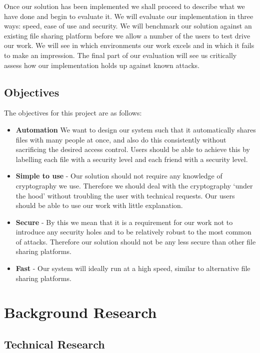 \documentclass[12pt, titlepage]{article}
\begin{document}
\newline \indent Once our solution has been implemented we shall proceed to describe what we have done and begin to evaluate it. We will evaluate our implementation in three ways: speed, ease of use and security. We will benchmark our solution against an existing file sharing platform before we allow a number of the users to test drive our work. We will see in which environments our work excels and in which it fails to make an impression. The final part of our evaluation will see us critically assess how our implementation holds up against known attacks.

\subsection{Objectives}
The objectives for this project are as follows:
\begin{itemize}
	\item \textbf{Automation} We want to design our system such that it automatically shares files with many people at once, and also do this consistently without sacrificing the desired access control. Users should be able to achieve this by labelling each file with a security level and each friend with a security level.
	\item \textbf{Simple to use} - Our solution should not require any knowledge of cryptography we use. Therefore we should deal with the cryptography `under the hood' without troubling the user with technical requests. Our users should be able to use our work with little explanation.
	\item \textbf{Secure} - By this we mean that it is a requirement for our work not to introduce any security holes and to be relatively robust to the most common of attacks. Therefore our solution should not be any less secure than other file sharing platforms.
	\item \textbf{Fast} - Our system will ideally run at a high speed, similar to alternative file sharing platforms.
\end{itemize} 

\newpage
\section{Background Research}

\subsection{Technical Research}
\end{document}

